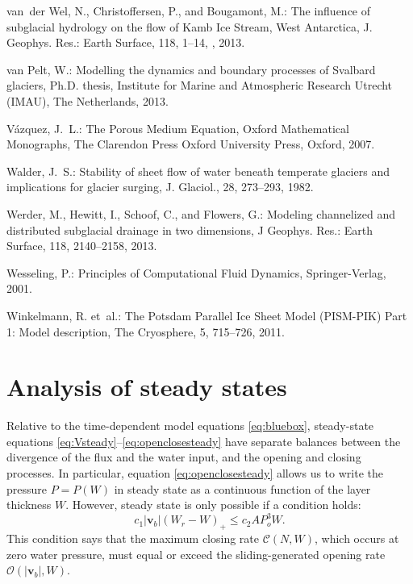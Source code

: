 \documentclass[gmd]{copernicus}   %
\newcommand\bv{\mathbf{v}}
\begin{document}
\begin{thebibliography}{}
van~der Wel, N., Christoffersen, P., and Bougamont, M.: The influence of
  subglacial hydrology on the flow of {K}amb {I}ce {S}tream, {W}est
  {A}ntarctica, J. Geophys. Res.: Earth Surface, 118, 1--14,
  , 2013.

van Pelt, W.: Modelling the dynamics and boundary processes of {S}valbard
  glaciers, Ph.D. thesis, Institute for Marine and Atmospheric Research Utrecht
  (IMAU), The Netherlands, 2013.

V{\'a}zquez, J.~L.: The {P}orous {M}edium {E}quation, Oxford Mathematical
  Monographs, The Clarendon Press Oxford University Press, Oxford, 2007.

Walder, J.~S.: Stability of sheet flow of water beneath temperate glaciers and
  implications for glacier surging, J. Glaciol., 28, 273--293, 1982.

Werder, M., Hewitt, I., Schoof, C., and Flowers, G.: Modeling channelized and
  distributed subglacial drainage in two dimensions, J Geophys. Res.: Earth
  Surface, 118, 2140--2158, 2013.

Wesseling, P.: Principles of {C}omputational {F}luid {D}ynamics,
  Springer-Verlag, 2001.

Winkelmann, R. et~al.: The {P}otsdam {P}arallel {I}ce {S}heet
  {M}odel ({PISM-PIK}) {P}art 1: {M}odel description, The Cryosphere, 5,
  715--726, 2011.
\end{thebibliography}


\appendix

\section{Analysis of steady states}  Relative to the time-dependent model equations \eqref{eq:bluebox}, steady-state equations \eqref{eq:Vsteady}--\eqref{eq:openclosesteady} have separate balances between the divergence of the flux and the water input, and the opening and closing processes.  In particular, equation \eqref{eq:openclosesteady} allows us to write the pressure $P=P(W)$ in steady state as a continuous function of the layer thickness $W$.  However, steady state is only possible if a condition holds:
\begin{equation}
c_1 |\bv_b| (W_r - W)_+ \le c_2 A P_o^3 W. \label{eq:steadyboundfirst}
\end{equation}
This condition says that the maximum closing rate $\mathcal{C}(N,W)$, which occurs at zero water pressure, must equal or exceed the sliding-generated opening rate $\mathcal{O}(|\bv_b|,W)$.
\end{document}
